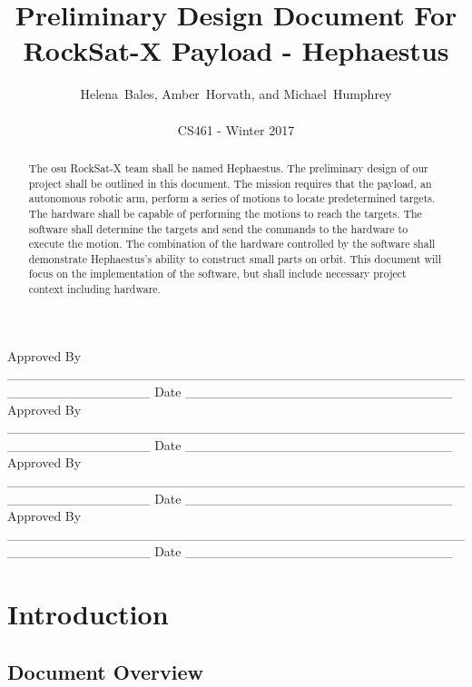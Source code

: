 \documentclass[letterpaper,10pt]{article}
\title{Preliminary Design Document For RockSat-X Payload - Hephaestus}
\author{Helena~Bales, Amber~Horvath, and Michael~Humphrey\\ \\ CS461 - Winter 2017}
\newenvironment{bottompar}{\par\vspace*{\fill}}{\clearpage}
\begin{document}
\maketitle

\begin{abstract}
The \gls{osu} RockSat-X team shall be named Hephaestus.
The preliminary design of our project shall be outlined in this document.
The mission requires that the \gls{payload}, an autonomous robotic arm, perform a series of motions to locate predetermined targets.
The hardware shall be capable of performing the motions to reach the targets.
The software shall determine the targets and send the commands to the hardware to execute the motion.
The combination of the hardware controlled by the software shall demonstrate Hephaestus's ability to construct small parts on orbit.
This document will focus on the implementation of the software, but shall include necessary project context including hardware.
\end{abstract}

\begin{bottompar}
Approved By
\_\_\_\_\_\_\_\_\_\_\_\_\_\_\_\_\_\_\_\_\_\_\_\_\_\_\_\_\_\_\_\_\_\_\_\_\_\_\_\_\_\_\_\_\_\_\_\_\_\_\_\_\_\_\_\_\_\_\_\_\_\_\_
Date \_\_\_\_\_\_\_\_\_\_\_\_\_\_\_\_\_\_\_\_\_\_\_\_\_\_\_\_ \\


Approved By
\_\_\_\_\_\_\_\_\_\_\_\_\_\_\_\_\_\_\_\_\_\_\_\_\_\_\_\_\_\_\_\_\_\_\_\_\_\_\_\_\_\_\_\_\_\_\_\_\_\_\_\_\_\_\_\_\_\_\_\_\_\_\_
Date \_\_\_\_\_\_\_\_\_\_\_\_\_\_\_\_\_\_\_\_\_\_\_\_\_\_\_\_ \\


Approved By
\_\_\_\_\_\_\_\_\_\_\_\_\_\_\_\_\_\_\_\_\_\_\_\_\_\_\_\_\_\_\_\_\_\_\_\_\_\_\_\_\_\_\_\_\_\_\_\_\_\_\_\_\_\_\_\_\_\_\_\_\_\_\_
Date \_\_\_\_\_\_\_\_\_\_\_\_\_\_\_\_\_\_\_\_\_\_\_\_\_\_\_\_ \\


Approved By
\_\_\_\_\_\_\_\_\_\_\_\_\_\_\_\_\_\_\_\_\_\_\_\_\_\_\_\_\_\_\_\_\_\_\_\_\_\_\_\_\_\_\_\_\_\_\_\_\_\_\_\_\_\_\_\_\_\_\_\_\_\_\_
Date \_\_\_\_\_\_\_\_\_\_\_\_\_\_\_\_\_\_\_\_\_\_\_\_\_\_\_\_ \\
\end{bottompar}

\clearpage
\tableofcontents
\clearpage

\section{Introduction}
\subsection{Document Overview}
\end{document}
